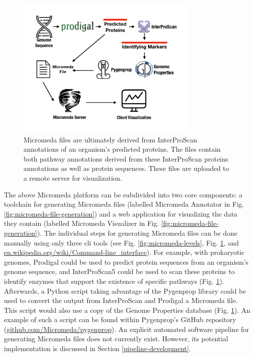\begin{figure}[!ht]
  \centering
	\includegraphics[width=0.8\textwidth]{media/how-micromeda-files-are-built.pdf}
	 \caption{Micromeda files are ultimately derived from InterProScan annotations of an organism's predicted proteins. The files contain both pathway annotations derived from these InterProScan proteins annotations as well as protein sequences. These files are uploaded to a remote server for visualization.}
	 \label{fig:micromeda-file-building-and-use}
\end{figure}

The above Micromeda platform can be subdivided into two core components: a toolchain for generating Micromeda files (labelled Micromeda Annotator in Fig. \ref{fig:micromeda-file-generation}) and a web application for visualizing the data they contain (labelled Micromeda Visualizer in Fig. \ref{fig:micromeda-file-generation}). The individual steps for generating Micromeda files can be done manually using only three \gls{cli} tools (see Fig. \ref{fig:micromeda-levels}, Fig. \ref{fig:micromeda-file-building-and-use}, and  \href{http://en.wikipedia.org/wiki/Command-line_interface}{en.wikipedia.org/wiki/Command-line\_interface}). For example, with prokaryotic genomes, Prodigal could be used to predict protein sequences from an organism's genome sequence, and InterProScan5 could be used to scan these proteins to identify enzymes that support the existence of specific pathways (Fig. \ref{fig:micromeda-file-building-and-use}). Afterwards, a Python script taking advantage of the Pygenprop library could be used to convert the output from InterProScan and Prodigal a Micromeda file. This script would also use a copy of the Genome Properties database (Fig. \ref{fig:micromeda-file-building-and-use}). An example of such a script can be found within Pygenprop's GitHub repository (\href{http://github.com/Micromeda/pygenprop}{github.com/Micromeda/pygenprop}). An explicit automated software pipeline for generating Micromeda files does not currently exist. However, its potential implementation is discussed in Section \ref{pipeline-development}.

